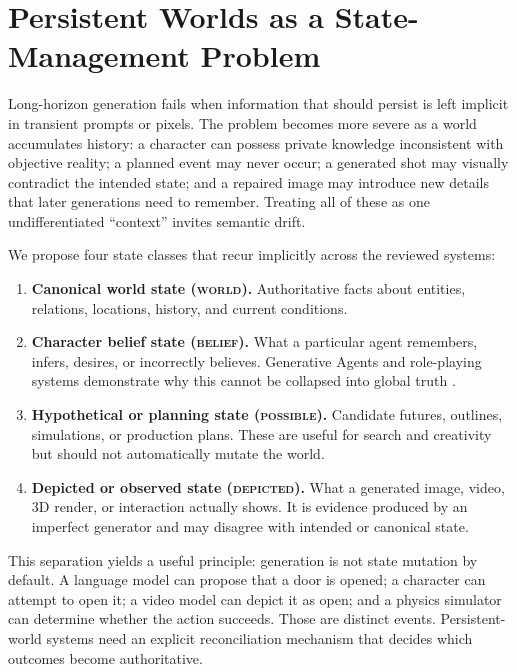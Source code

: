 \documentclass{article}
\newcommand{\state}[1]{\textsc{#1}}
\begin{document}
\section{Persistent Worlds as a State-Management Problem}
\label{sec:state}

Long-horizon generation fails when information that should persist is left implicit in transient prompts or pixels. The problem becomes more severe as a world accumulates history: a character can possess private knowledge inconsistent with objective reality; a planned event may never occur; a generated shot may visually contradict the intended state; and a repaired image may introduce new details that later generations need to remember. Treating all of these as one undifferentiated “context” invites semantic drift.

We propose four state classes that recur implicitly across the reviewed systems:

\begin{enumerate}[leftmargin=*]
  \item \textbf{Canonical world state (\state{world}).} Authoritative facts about entities, relations, locations, history, and current conditions.
  \item \textbf{Character belief state (\state{belief}).} What a particular agent remembers, infers, desires, or incorrectly believes. Generative Agents and role-playing systems demonstrate why this cannot be collapsed into global truth \citep{park2023generativeagents,wang2026roleplaysurvey}.
  \item \textbf{Hypothetical or planning state (\state{possible}).} Candidate futures, outlines, simulations, or production plans. These are useful for search and creativity but should not automatically mutate the world.
  \item \textbf{Depicted or observed state (\state{depicted}).} What a generated image, video, 3D render, or interaction actually shows. It is evidence produced by an imperfect generator and may disagree with intended or canonical state.
\end{enumerate}

This separation yields a useful principle: generation is not state mutation by default. A language model can propose that a door is opened; a character can attempt to open it; a video model can depict it as open; and a physics simulator can determine whether the action succeeds. Those are distinct events. Persistent-world systems need an explicit reconciliation mechanism that decides which outcomes become authoritative.
\end{document}
